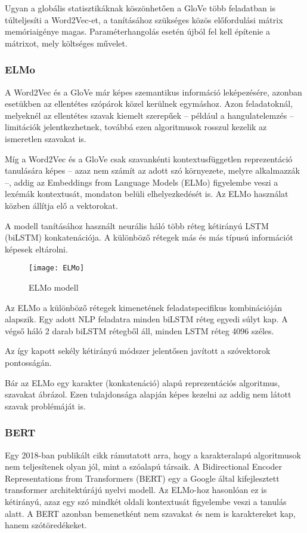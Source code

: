 Ugyan a globális statisztikáknak köszönhetően a GloVe több feladatban is túlteljesíti a Word2Vec-et, a tanításához szükséges közös előfordulási mátrix memóriaigénye magas. Paraméterhangolás esetén újból fel kell építenie a mátrixot, mely költséges művelet.

\subsubsection{ELMo}
A Word2Vec és a GloVe már képes szemantikus információ leképezésére, azonban esetükben az ellentétes szópárok közel kerülnek egymáshoz. Azon feladatoknál, melyeknél az ellentétes szavak kiemelt szerepűek – például a hangulatelemzés – limitációk jelentkezhetnek, továbbá ezen algoritmusok rosszul kezelik az ismeretlen szavakat is.

Míg a Word2Vec és a GloVe csak szavankénti kontextusfüggetlen reprezentáció tanulására képes – azaz nem számít az adott szó környezete, melyre alkalmazzák –, addig az Embeddings from Language Models (ELMo) figyelembe veszi a lexémák kontextusát, mondaton belüli elhelyezkedését is. Az ELMo használat közben állítja elő a vektorokat.

A modell tanításához használt neurális háló több réteg kétirányú LSTM (biLSTM) konkatenációja. A különböző rétegek más és más típusú információt képesek eltárolni.

\begin{figure}[H]
	\centering
	\texttt{[image: ELMo]}
	\caption{ELMo modell}
\end{figure}

Az ELMo a különböző rétegek kimenetének feladatspecifikus kombinációján alapszik. Egy adott NLP feladatra minden biLSTM réteg egyedi súlyt kap. A végső háló 2 darab biLSTM rétegből áll, minden LSTM réteg 4096 széles.

Az így kapott sekély kétirányú módszer jelentősen javított a szóvektorok pontosságán.

Bár az ELMo egy karakter (konkatenáció) alapú reprezentációs algoritmus, szavakat ábrázol. Ezen tulajdonsága alapján képes kezelni az addig nem látott szavak problémáját is.


\subsubsection{BERT}
Egy 2018-ban publikált cikk rámutatott arra, hogy a karakteralapú algoritmusok nem teljesítenek olyan jól, mint a szóalapú társaik. A Bidirectional Encoder Representations from Transformers (BERT) egy a Google által kifejlesztett transformer architektúrájú nyelvi modell. Az ELMo-hoz hasonlóan ez is kétirányú, azaz egy szó mindkét oldali kontextusát figyelembe veszi a tanulás alatt. A BERT azonban bemenetként nem szavakat és nem is karaktereket kap, hanem szótöredékeket.

